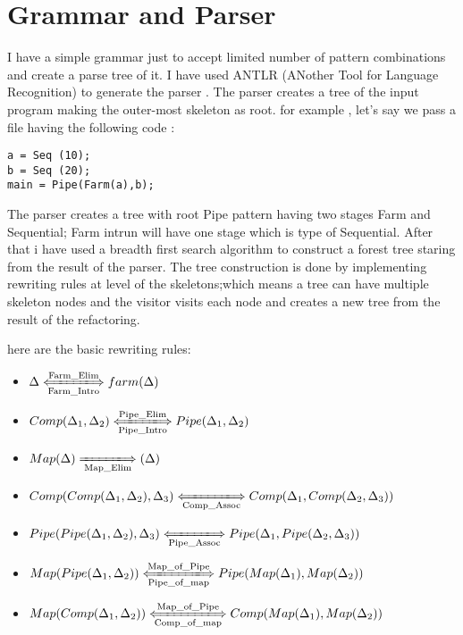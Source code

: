 \documentclass[12pt]{report}
\begin{document}
	
\title{}

\maketitle

\section{Grammar and Parser}
I have a simple grammar just to accept limited number of pattern combinations and create a parse tree of it. I have used ANTLR (ANother Tool for Language Recognition)  to generate the parser . The parser creates a tree of the input program making the outer-most skeleton as root. for example , let's say we pass a file having the following code :

\begin{lstlisting}[style=refactor, caption={example input program},label={code1}]
a = Seq (10);
b = Seq (20);
main = Pipe(Farm(a),b);
\end{lstlisting}
The parser creates a tree with root Pipe pattern having two stages Farm and Sequential; Farm intrun will have one stage which is type of Sequential. After that i have used a breadth first search algorithm to construct a forest tree staring from the result of the parser. The tree construction is done by implementing rewriting rules at level of the skeletons;which means a tree can have multiple skeleton nodes and the visitor visits each node and creates a new tree from the result of the refactoring. 

here are the basic rewriting rules:

\begin{itemize}
\item $\Delta \xLongleftrightarrow[\text{Farm\_Intro}]{\text{Farm\_Elim}} farm (\Delta)$\\
\item $Comp(\Delta_1, \Delta_2 )\xLongleftrightarrow[\text{Pipe\_Intro}]{\text{Pipe\_Elim}} Pipe (\Delta_1,\Delta_2)$\\
\item $Map(\Delta) \xLongrightarrow[\text{Map\_Elim}]{\text{}}  (\Delta)$\\
\item $Comp(Comp(\Delta_1, \Delta_2 ),\Delta_3)\xLongleftrightarrow[\text{Comp\_Assoc}]{\text{}} Comp (\Delta_1,Comp(\Delta_2,\Delta_3))$\\
\item $Pipe(Pipe(\Delta_1, \Delta_2 ),\Delta_3)\xLongleftrightarrow[\text{Pipe\_Assoc}]{\text{}} Pipe (\Delta_1,Pipe(\Delta_2,\Delta_3))$\\
\item $Map(Pipe(\Delta_1, \Delta_2 ))\xLongleftrightarrow[\text{Pipe\_of\_map}]{\text{Map\_of\_Pipe}} Pipe (Map(\Delta_1),Map(\Delta_2))$\\
\item $Map(Comp(\Delta_1, \Delta_2 ))\xLongleftrightarrow[\text{Comp\_of\_map}]{\text{Map\_of\_Pipe}} Comp (Map(\Delta_1),Map(\Delta_2))$\\
\end{itemize}
\end{document}
